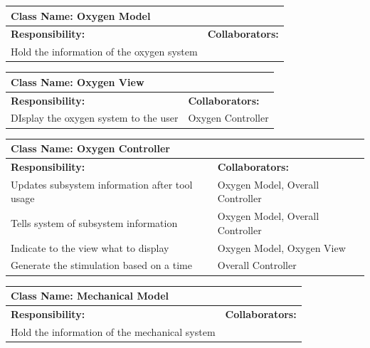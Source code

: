 \documentclass[12pt, titlepage]{article}
\begin{document}
\begin{enumerate}[a)]
	\begin{table}[H]
		\centering
		\begin{tabular}{|p{5cm}|p{5cm}|}
		\hline 
		 \multicolumn{2}{|l|}{\textbf{Class Name: Oxygen Model}} \\
		\hline
		\textbf{Responsibility:} & \textbf{Collaborators:} \\
		\hline
		 Hold the information of the oxygen system & \\
		\hline
		\end{tabular}
	\end{table}

	\begin{table}[H]
		\centering
		\begin{tabular}{|p{5cm}|p{5cm}|}
		\hline 
		 \multicolumn{2}{|l|}{\textbf{Class Name: Oxygen View}} \\
		\hline
		\textbf{Responsibility:} & \textbf{Collaborators:} \\
		\hline
		 DIsplay the oxygen system to the user & Oxygen Controller\\
		\hline
		\end{tabular}
	\end{table}

	\begin{table}[H]
		\centering
		\begin{tabular}{|p{5cm}|p{5cm}|}
		\hline 
		 \multicolumn{2}{|l|}{\textbf{Class Name: Oxygen Controller}} \\
		\hline
		\textbf{Responsibility:} & \textbf{Collaborators:} \\
		\hline
		Updates subsystem information after tool usage & Oxygen Model, Overall Controller\\
		\hline
		 Tells system of subsystem information & Oxygen Model, Overall Controller\\
		\hline
		 Indicate to the view what to display & Oxygen Model, Oxygen View\\
		\hline
		 Generate the stimulation based on a time & Overall Controller \\
		\hline
		\end{tabular}
	\end{table}

	\begin{table}[H]
		\centering
		\begin{tabular}{|p{5cm}|p{5cm}|}
		\hline 
		 \multicolumn{2}{|l|}{\textbf{Class Name: Mechanical Model}} \\
		\hline
		\textbf{Responsibility:} & \textbf{Collaborators:} \\
		\hline
		 Hold the information of the mechanical system & \\
		\hline
		\end{tabular}
	\end{table}


\end{enumerate}
\end{document}
